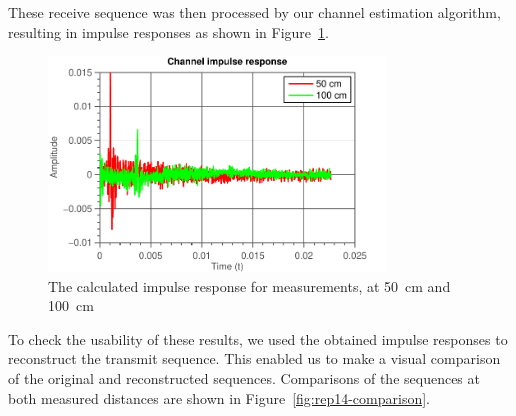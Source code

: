 \documentclass[11pt,titlepage]{report}
\begin{document}
These receive sequence was then processed by our channel estimation algorithm, resulting in impulse responses as shown in Figure~\ref{fig:rep14-impulse}.

\begin{figure}[H]
	\centering
	\includegraphics[width=0.8\textwidth]{../../deliverable-7-resources/figures/ass-1/report-14-15/ass-1-report-14-impulse-responses.pdf}
	\caption{The calculated impulse response for measurements, at \SI{50}{cm} and \SI{100}{cm}}
	\label{fig:rep14-impulse}
\end{figure}

To check the usability of these results, we used the obtained impulse responses to reconstruct the transmit sequence. This enabled us to make a visual comparison of the original and reconstructed sequences. Comparisons of the sequences at both measured distances are shown in Figure~\ref{fig:rep14-comparison}.
\end{document}
